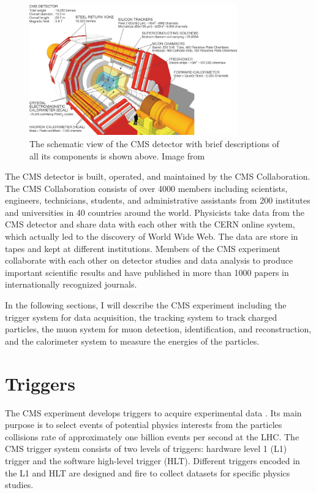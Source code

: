 \begin{figure}[hbtp]
\begin{center}
\includegraphics[width=0.80\textwidth]{Figures/Chapter3/CMSDecPic.jpg}
\caption{The schematic view of the CMS detector with brief descriptions of all its components is shown above. Image from \cite{HiggsCMS}}
\label{CMSDecPic}
\end{center}
\end{figure} 

The CMS detector is built, operated, and maintained by the CMS Collaboration. The CMS Collaboration consists of over 4000 members including scientists, engineers, technicians, students, and administrative assistants from 200 institutes and universities in 40 countries around the world. Physicists take data from the CMS detector and share data with each other with the CERN online system, which actually led to the discovery of World Wide Web. The data are store in tapes and kept at different institutions. Members of the CMS experiment collaborate with each other on detector studies and data analysis to produce important scientific results and have published in more than 1000 papers in internationally recognized journals.

In the following sections, I will describe the CMS experiment including the trigger system for data acquisition, the tracking system to track charged particles, the muon system for muon detection, identification, and reconstruction, and the calorimeter system to measure the energies of the particles.

\section{Triggers}

The CMS experiment develops triggers to acquire experimental data \cite{CMSTrigger}. Its main purpose is to select events of potential physics interests from the particles collisions rate of approximately one billion events per second at the LHC. The CMS trigger system consists of two levels of triggers: hardware level 1 (L1) trigger and the software high-level trigger (HLT). Different triggers encoded in the L1 and HLT are designed and fire to collect datasets for specific physics studies.

